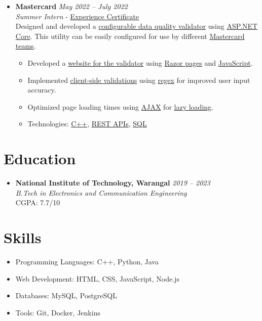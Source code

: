 \documentclass[a4paper,10pt]{article} %
\begin{document}
\begin{itemize}[leftmargin=0.3in, itemsep=0.7pt, topsep=2pt]
    \item
    \textbf{Mastercard} \hfill \textit{May 2022 – July 2022} \\
    \textit{Summer Intern} - \href{https://drive.google.com/file/d/1ZbCn1KdSOp6jQ81p2Z8JYz5PDfkcwUmJ/view?usp=sharing}{\underline{Experience Certificate}} 
    \vspace{0.25em}\\
    Designed and developed a \underline{configurable data quality validator} using \underline{ASP.NET Core}. This utility can be easily configured for use by different \underline{Mastercard teams}.
\begin{itemize}[leftmargin=*]
    \item Developed a \underline{website for the validator} using \underline{Razor pages} and \underline{JavaScript}.
    \item Implemented \underline{client-side validations} using \underline{regex} for improved user input accuracy.
    \item Optimized page loading times using \underline{AJAX} for \underline{lazy loading}.
    \item Technologies: \underline{C++}, \underline{REST APIs}, \underline{SQL}
\end{itemize}
\end{itemize}

\vspace{0.3em} %

\section*{Education}
\begin{itemize}[leftmargin=0.3in, itemsep=3pt, topsep=2pt]
    \item
    \textbf{National Institute of Technology, Warangal} \hfill \textit{2019 – 2023} \\
    \textit{B.Tech in Electronics and Communication Engineering} \\
    CGPA: 7.7/10
\end{itemize}

\vspace{0.3em} %

\section*{Skills}
\begin{itemize}[leftmargin=0.3in, itemsep=0.7pt, topsep=2pt]
    \item Programming Languages: C++, Python, Java
    \item Web Development: HTML, CSS, JavaScript, Node.js
    \item Databases: MySQL, PostgreSQL
    \item Tools: Git, Docker, Jenkins
\end{itemize}
\end{document}
